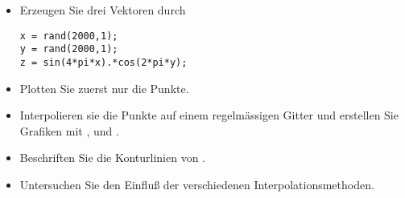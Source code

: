 \begin{aufg}[0]
\begin{itemize}
\item Erzeugen Sie drei Vektoren durch 
\begin{lstlisting}
x = rand(2000,1);
y = rand(2000,1);
z = sin(4*pi*x).*cos(2*pi*y);
\end{lstlisting}
\item Plotten Sie zuerst nur die Punkte.
\item Interpolieren sie die Punkte auf einem regelmässigen Gitter und erstellen Sie Grafiken mit ,  und .
\item Beschriften Sie die Konturlinien von .
\item Untersuchen Sie den Einflu{\ss} der verschiedenen
  Interpolationsmethoden. 
\end{itemize}
\end{aufg}